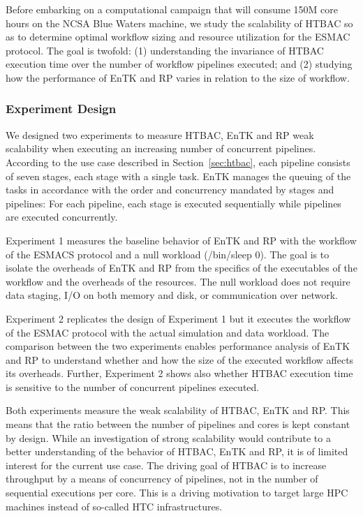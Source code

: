 
Before embarking on a computational campaign that will consume 150M core
hours on the NCSA Blue Waters machine, we study the scalability of HTBAC so
as to determine optimal workflow sizing and resource utilization for the
ESMAC protocol. The goal is twofold: (1) understanding the invariance of
HTBAC execution time over the number of workflow pipelines executed; and (2)
studying how the performance of EnTK and RP varies in relation to the size of
workflow.

\subsubsection{Experiment Design}\label{ssec:exp_design}

We designed two experiments to measure HTBAC, EnTK and RP weak scalability
when executing an increasing number of concurrent pipelines. According to the
use case described in Section~\ref{sec:htbac}, each pipeline consists of
seven stages, each stage with a single task. EnTK manages the queuing of the
tasks in accordance with the order and concurrency mandated by stages and
pipelines: For each pipeline, each stage is executed sequentially while
pipelines are executed concurrently.

Experiment 1 measures the baseline behavior of EnTK and RP with the workflow
of the ESMACS protocol and a null workload (\textmd{/bin/sleep 0}). The goal
is to isolate the overheads of EnTK and RP from the specifics of the
executables of the workflow and the overheads of the resources. The null
workload does not require data staging, I/O on both memory and disk, or
communication over network.

Experiment 2 replicates the design of Experiment 1 but it executes the
workflow of the ESMAC protocol with the actual simulation and data workload.
The comparison between the two experiments enables performance analysis of
EnTK and RP to understand whether and how the size of the executed workflow
affects its overheads. Further, Experiment 2 shows also whether HTBAC
execution time is sensitive to the number of concurrent pipelines executed.

Both experiments measure the weak scalability of HTBAC, EnTK and RP\@. This
means that the ratio between the number of pipelines and cores is kept
constant by design. While an investigation of strong scalability would
contribute to a better understanding of the behavior of HTBAC, EnTK and RP,
it is of limited interest for the current use case. The driving goal of HTBAC
is to increase throughput by a means of concurrency of pipelines, not in the
number of sequential executions per core. This is a driving motivation to
target large HPC machines instead of so-called HTC infrastructures.

